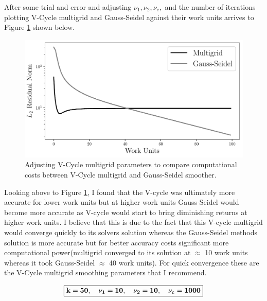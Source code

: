     After some trial and error and adjusting $\nu_1, \nu_2, \nu_c, $ and the number of iterations plotting V-Cycle multigrid and Gauss-Seidel against their work units arrives to Figure \ref{fig:vcyc_gs} shown below.

    \begin{figure}[h]
        \centering
        \includegraphics[width = 0.9\linewidth]{tasks/figs/vcyc_gs.pdf}
        \caption[V-Cycle Multigrid Smoothing Iterations]{Adjusting V-Cycle multigrid parameters to compare computational costs between V-Cycle multigrid and Gauss-Seidel smoother.}
        \label{fig:vcyc_gs}
    \end{figure}

    Looking above to Figure \ref{fig:vcyc_gs}, I found that the V-cycle was ultimately more accurate for lower work units but at higher work units Gauss-Seidel would become more accurate as V-cycle would start to bring diminishing returns at higher work units. I believe that this is due to the fact that this V-cycle multigrid would converge quickly to its solvers solution whereas the Gauss-Seidel methods solution is more accurate but for better accuracy costs significant more computational power(multigrid converged to its solution at $\approx$ 10 work units whereas it took Gauss-Seidel $\approx$ 40 work units). For quick convergence these are the V-Cycle multigrid smoothing parameters that I recommend.

    \begin{equation*}
        \boxed{\bf k = 50,\quad \nu_1 = 10,\quad \nu_2 = 10,\quad \nu_c = 1000}
    \end{equation*}